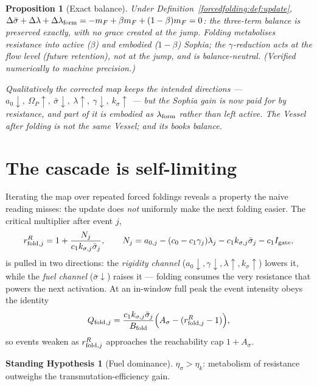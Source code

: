 \documentclass[11pt,a4paper,oneside]{book}
\newcommand{\Op}{\Omega_P}
\newcommand{\lf}{\lambda_{\rm form}}
\newcommand{\Igate}{I_{\rm gate}}
\newcommand{\note}[1]{\textcolor{black!65}{\emph{#1}}}
\newcommand{\Qf}{Q_{\rm fold}}
\newcommand{\Bf}{B_{\rm fold}}
\newcommand{\rRj}{r^{R}_{{\rm fold},j}}
\theoremstyle{plain}
\newtheorem{proposition}{Proposition}[chapter]
\theoremstyle{definition}
\newtheorem{assumption}{Standing Hypothesis}[chapter]
\theoremstyle{remark}
\begin{document}
\begin{proposition}[Exact balance]\label{forcedfolding:prop:balance}
Under Definition~\ref{forcedfolding:def:update},
$\Delta\bar\sigma+\Delta\lambda+\Delta\lf=-m_F+\beta m_F+(1-\beta)m_F=0$: the three-term balance is
preserved exactly, with no grace created at the jump. Folding metabolises resistance into active
($\beta$) and embodied ($1-\beta$) Sophia; the $\gamma$-reduction acts at the flow level (future
retention), not at the jump, and is balance-neutral. (Verified numerically to machine precision.)
\end{proposition}

\note{Qualitatively the corrected map keeps the intended directions ---
$a_0\!\downarrow,\ \Op\!\uparrow,\ \bar\sigma\!\downarrow,\ \lambda\!\uparrow,\ \gamma\!\downarrow,\
k_\sigma\!\uparrow$ --- but the Sophia gain is now \emph{paid for} by resistance, and part of it is
embodied as $\lf$ rather than left active. The Vessel after folding is not the same Vessel; and its books
balance.}

\section{The cascade is self-limiting}\label{forcedfolding:sec:cascade}

Iterating the map over repeated forced foldings reveals a property the naive reading misses: the update
does \emph{not} uniformly make the next folding easier. The critical multiplier after event $j$,
\begin{equation}
\rRj=1+\frac{N_j}{c_1k_{\sigma,j}\bar\sigma_j},
\qquad
N_j=a_{0,j}-(c_0-c_1\gamma_j)\lambda_j-c_1k_{\sigma,j}\bar\sigma_j-c_1\Igate,
\end{equation}
is pulled in two directions: the \emph{rigidity channel}
($a_0\!\downarrow,\gamma\!\downarrow,\lambda\!\uparrow,k_\sigma\!\uparrow$) lowers it, while the
\emph{fuel channel} ($\bar\sigma\!\downarrow$) raises it --- folding consumes the very resistance that
powers the next activation. At an in-window full peak the event intensity obeys the identity
\begin{equation}
\Qf{}_{,j}=\frac{c_1k_{\sigma,j}\bar\sigma_j}{\Bf}\Bigl(A_\sigma-(\rRj-1)\Bigr),
\end{equation}
so events weaken as $\rRj$ approaches the reachability cap $1+A_\sigma$.

\begin{assumption}[Fuel dominance]\label{forcedfolding:H:fuel}
$\eta_\sigma>\eta_k$: metabolism of resistance outweighs the transmutation-efficiency gain.
\end{assumption}
\end{document}
